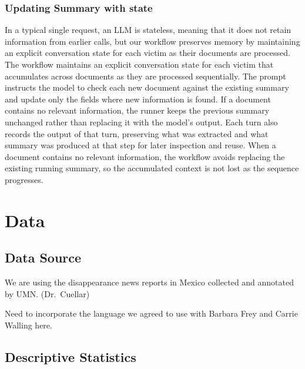 \documentclass{article}
\begin{document}
\subsubsection{Updating Summary with
state}\label{updating-summary-with-state}

In a typical single request, an LLM is stateless, meaning that it does
not retain information from earlier calls, but our workflow preserves
memory by maintaining an explicit conversation state for each victim as
their documents are processed. The workflow maintains an explicit
conversation state for each victim that accumulates across documents as
they are processed sequentially. The prompt instructs the model to check
each new document against the existing summary and update only the
fields where new information is found. If a document contains no
relevant information, the runner keeps the previous summary unchanged
rather than replacing it with the model's output. Each turn also records
the output of that turn, preserving what was extracted and what summary
was produced at that step for later inspection and reuse. When a
document contains no relevant information, the workflow avoids replacing
the existing running summary, so the accumulated context is not lost as
the sequence progresses.


\section{Data}\label{data}

\subsection{Data Source}\label{data-source}

We are using the disappearance news reports in Mexico collected and
annotated by UMN. (Dr.~Cuellar)

Need to incorporate the language we agreed to use with Barbara Frey and Carrie Walling here.

\subsection{Descriptive Statistics}\label{descriptive-statistics}
\end{document}
